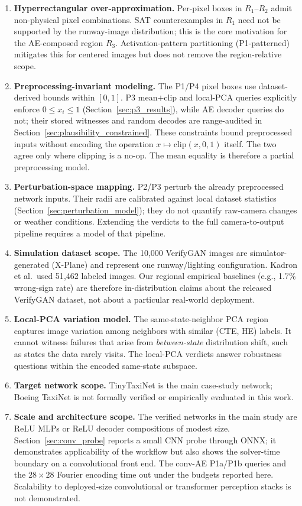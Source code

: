 \documentclass[twocolumn,smallextended,runningheads]{svjour3}
\begin{document}
\begin{enumerate}[nosep]
  \item \textbf{Hyperrectangular over-approximation.} Per-pixel boxes in $R_1$--$R_2$ admit non-physical pixel combinations. SAT counterexamples in $R_1$ need not be supported by the runway-image distribution; this is the core motivation for the AE-composed region $R_3$. Activation-pattern partitioning (P1-patterned) mitigates this for centered images but does not remove the region-relative scope.
  \item \textbf{Preprocessing-invariant modeling.} The P1/P4 pixel boxes use dataset-derived bounds within $[0,1]$. P3 mean$+$clip and local-PCA queries explicitly enforce $0\le x_i\le1$ (Section~\ref{sec:p3_results}), while AE decoder queries do not; their stored witnesses and random decodes are range-audited in Section~\ref{sec:plausibility_constrained}. These constraints bound preprocessed inputs without encoding the operation $x\mapsto\mathrm{clip}(x,0,1)$ itself. The two agree only where clipping is a no-op. The mean equality is therefore a partial preprocessing model.
  \item \textbf{Perturbation-space mapping.} P2/P3 perturb the already preprocessed network inputs. Their radii are calibrated against local dataset statistics (Section~\ref{sec:perturbation_model}); they do not quantify raw-camera changes or weather conditions. Extending the verdicts to the full camera-to-output pipeline requires a model of that pipeline.
  \item \textbf{Simulation dataset scope.} The 10{,}000 VerifyGAN images are simulator-generated (X-Plane) and represent one runway/lighting configuration. Kadron et al.\ used 51{,}462 labeled images. Our regional empirical baselines (e.g., 1.7\% wrong-sign rate) are therefore in-distribution claims about the released VerifyGAN dataset, not about a particular real-world deployment.
  \item \textbf{Local-PCA variation model.} The same-state-neighbor PCA region captures image variation among neighbors with similar (CTE, HE) labels. It cannot witness failures that arise from \emph{between-state} distribution shift, such as states the data rarely visits. The local-PCA verdicts answer robustness questions within the encoded same-state subspace.
  \item \textbf{Target network scope.} TinyTaxiNet is the main case-study network; Boeing TaxiNet is not formally verified or empirically evaluated in this work.
  \item \textbf{Scale and architecture scope.} The verified networks in the main study are ReLU MLPs or ReLU decoder compositions of modest size. Section~\ref{sec:conv_probe} reports a small CNN probe through ONNX; it demonstrates applicability of the workflow but also shows the solver-time boundary on a convolutional front end. The conv-AE P1a/P1b queries and the $28{\times}28$ Fourier encoding time out under the budgets reported here. Scalability to deployed-size convolutional or transformer perception stacks is not demonstrated.
\end{enumerate}
\end{document}
